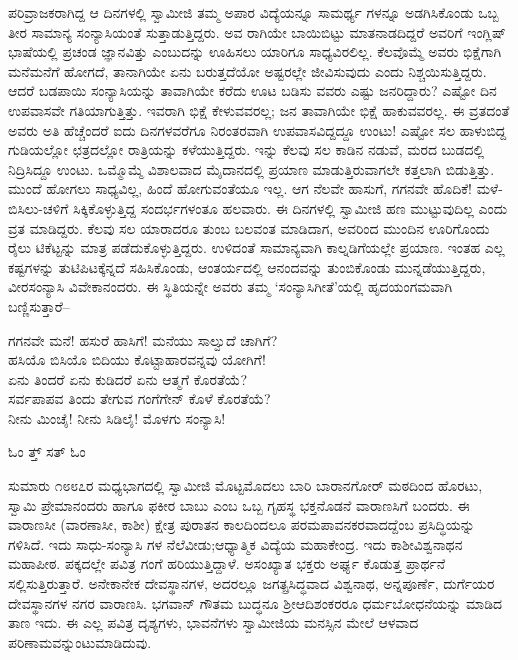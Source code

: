 ಪರಿವ್ರಾಜಕರಾಗಿದ್ದ ಆ ದಿನಗಳಲ್ಲಿ ಸ್ವಾಮೀಜಿ ತಮ್ಮ ಅಪಾರ ವಿದ್ಯೆಯನ್ನೂ ಸಾಮರ್ಥ್ಯ ಗಳನ್ನೂ ಅಡಗಿಸಿಕೊಂಡು ಒಬ್ಬ ತೀರ ಸಾಮಾನ್ಯ ಸಂನ್ಯಾಸಿಯಂತೆ ಸುತ್ತಾಡುತ್ತಿದ್ದರು. ಅವ ರಾಗಿಯೇ ಬಾಯಿಬಿಟ್ಟು ಮಾತನಾಡದಿದ್ದರೆ ಅವರಿಗೆ ಇಂಗ್ಲಿಷ್ ಭಾಷೆಯಲ್ಲಿ ಪ್ರಚಂಡ ಜ್ಞಾನವಿತ್ತು ಎಂಬುದನ್ನು ಊಹಿಸಲು ಯಾರಿಗೂ ಸಾಧ್ಯವಿರಲಿಲ್ಲ. ಕೆಲವೊಮ್ಮೆ ಅವರು ಭಿಕ್ಷೆಗಾಗಿ ಮನೆಮನೆಗೆ ಹೋಗದೆ, ತಾನಾಗಿಯೇ ಏನು ಬರುತ್ತದೆಯೋ ಅಷ್ಟರಲ್ಲೇ ಜೀವಿಸುವುದು ಎಂದು ನಿಶ್ಚಯಿಸುತ್ತಿದ್ದರು. ಆದರೆ ಬಡಪಾಯಿ ಸಂನ್ಯಾಸಿಯನ್ನು ತಾವಾಗಿಯೇ ಕರೆದು ಊಟ ಬಡಿಸು ವವರು ಎಷ್ಟು ಜನರಿದ್ದಾರು? ಎಷ್ಟೋ ದಿನ ಉಪವಾಸವೇ ಗತಿಯಾಗುತ್ತಿತ್ತು. ಇವರಾಗಿ ಭಿಕ್ಷೆ ಕೇಳುವವರಲ್ಲ; ಜನ ತಾವಾಗಿಯೇ ಭಿಕ್ಷೆ ಹಾಕುವವರಲ್ಲ. ಈ ವ್ರತದಂತೆ ಅವರು ಅತಿ ಹೆಚ್ಚೆಂದರೆ ಐದು ದಿನಗಳವರೆಗೂ ನಿರಂತರವಾಗಿ ಉಪವಾಸವಿದ್ದದ್ದೂ ಉಂಟು! ಎಷ್ಟೋ ಸಲ ಹಾಳುಬಿದ್ದ ಗುಡಿಯಲ್ಲೋ ಛತ್ರದಲ್ಲೋ ರಾತ್ರಿಯನ್ನು ಕಳೆಯುತ್ತಿದ್ದರು. ಇನ್ನು ಕೆಲವು ಸಲ ಕಾಡಿನ ನಡುವೆ, ಮರದ ಬುಡದಲ್ಲಿ ನಿದ್ರಿಸಿದ್ದೂ ಉಂಟು. ಒಮ್ಮೊಮ್ಮೆ ವಿಶಾಲವಾದ ಮೈದಾನದಲ್ಲಿ ಪ್ರಯಾಣ ಮಾಡುತ್ತಿರುವಾಗಲೇ ಕತ್ತಲಾಗಿ ಬಿಡುತ್ತಿತ್ತು. ಮುಂದೆ ಹೋಗಲು ಸಾಧ್ಯವಿಲ್ಲ, ಹಿಂದೆ ಹೋಗುವಂತೆಯೂ ಇಲ್ಲ. ಆಗ ನೆಲವೇ ಹಾಸುಗೆ, ಗಗನವೇ ಹೊದಿಕೆ! ಮಳೆ-ಬಿಸಿಲು-ಚಳಿಗೆ ಸಿಕ್ಕಿಕೊಳ್ಳುತ್ತಿದ್ದ ಸಂದರ್ಭಗಳಂತೂ ಹಲವಾರು. ಈ ದಿನಗಳಲ್ಲಿ ಸ್ವಾಮೀಜಿ ಹಣ ಮುಟ್ಟುವುದಿಲ್ಲ ಎಂದು ವ್ರತ ಮಾಡಿದ್ದರು. ಕೆಲವು ಸಲ ಯಾರಾದರೂ ತುಂಬ ಬಲವಂತ ಮಾಡಿದಾಗ, ಅವರಿಂದ ಮುಂದಿನ ಊರಿಗೊಂದು ರೈಲು ಟಿಕೆಟ್ಟನ್ನು ಮಾತ್ರ ಪಡೆದುಕೊಳ್ಳುತ್ತಿದ್ದರು. ಉಳಿದಂತೆ ಸಾಮಾನ್ಯವಾಗಿ ಕಾಲ್ನಡಿಗೆಯಲ್ಲೇ ಪ್ರಯಾಣ. ಇಂತಹ ಎಲ್ಲ ಕಷ್ಟಗಳನ್ನು ತುಟಿಪಿಟಕ್ಕೆನ್ನದೆ ಸಹಿಸಿಕೊಂಡು, ಆಂತರ್ಯದಲ್ಲಿ ಆನಂದವನ್ನು ತುಂಬಿಕೊಂಡು ಮುನ್ನಡೆಯುತ್ತಿದ್ದರು, ವೀರಸಂನ್ಯಾಸಿ ವಿವೇಕಾನಂದರು. ಈ ಸ್ಥಿತಿಯನ್ನೇ ಅವರು ತಮ್ಮ ‘ಸಂನ್ಯಾಸಿಗೀತೆ’ಯಲ್ಲಿ  ಹೃದಯಂಗಮವಾಗಿ ಬಣ್ಣಿಸುತ್ತಾರೆ–

\begin{myquote}
ಗಗನವೇ ಮನೆ! ಹಸುರೆ ಹಾಸಿಗೆ! ಮನೆಯು ಸಾಲ್ವುದೆ ಚಾಗಿಗೆ?\\ಹಸಿಯೊ ಬಿಸಿಯೊ ಬಿದಿಯು ಕೊಟ್ಟಾಹಾರವನ್ನವು ಯೋಗಿಗೆ!\\ಏನು ತಿಂದರೆ ಏನು ಕುಡಿದರೆ ಏನು ಆತ್ಮಗೆ ಕೊರತೆಯೆ?\\ಸರ್ವಪಾಪವ ತಿಂದು ತೇಗುವ ಗಂಗೆಗೇನ್ ಕೊಳೆ ಕೊರತೆಯೆ?\\ನೀನು ಮಿಂಚೈ! ನೀನು ಸಿಡಿಲೈ! ಮೊಳಗು ಸಂನ್ಯಾಸಿ!
\end{myquote}

\begin{flushright}
ಓಂ ತ್ತ್ ಸತ್ ಓಂ
\end{flushright}

\noindent

ಸುಮಾರು ೧೮೮೭ರ ಮಧ್ಯಭಾಗದಲ್ಲಿ ಸ್ವಾಮೀಜಿ ಮೊಟ್ಟಮೊದಲು ಬಾರಿ ಬಾರಾನಗೋರ್ ಮಠದಿಂದ ಹೊರಟು, ಸ್ವಾಮಿ ಪ್ರೇಮಾನಂದರು ಹಾಗೂ ಫಕೀರ ಬಾಬು ಎಂಬ ಒಬ್ಬ ಗೃಹಸ್ಥ ಭಕ್ತನೊಡನೆ ವಾರಾಣಸಿಗೆ ಬಂದರು. ಈ ವಾರಾಣಸೀ (ವಾರಣಾಸೀ, ಕಾಶೀ) ಕ್ಷೇತ್ರ ಪುರಾತನ ಕಾಲದಿಂದಲೂ ಪರಮಪಾವನಕರವಾದದ್ದೆಂಬ ಪ್ರಸಿದ್ಧಿಯನ್ನು ಗಳಿಸಿದೆ. ಇದು ಸಾಧು-ಸಂನ್ಯಾಸಿ ಗಳ ನೆಲೆವೀಡು;ಆಧ್ಯಾತ್ಮಿಕ ವಿದ್ಯೆಯ ಮಹಾಕೇಂದ್ರ. ಇದು ಕಾಶೀವಿಶ್ವನಾಥನ ಮಹಾಪೀಠ. ಪಕ್ಕದಲ್ಲೇ ಪವಿತ್ರ ಗಂಗೆ ಹರಿಯುತ್ತಿದ್ದಾಳೆ. ಅಸಂಖ್ಯಾತ ಭಕ್ತರು ಅರ್ಘ್ಯ ಕೊಡುತ್ತ ಪ್ರಾರ್ಥನೆ ಸಲ್ಲಿಸುತ್ತಿರುತ್ತಾರೆ. ಅನೇಕಾನೇಕ ದೇವಸ್ಥಾನಗಳ, ಅದರಲ್ಲೂ ಜಗತ್ಪ್ರಸಿದ್ಧವಾದ ವಿಶ್ವನಾಥ, ಅನ್ನಪೂರ್ಣೆ, ದುರ್ಗೆಯರ ದೇವಸ್ಥಾನಗಳ ನಗರ ವಾರಾಣಸಿ. ಭಗವಾನ್ ಗೌತಮ ಬುದ್ಧನೂ ಶ್ರೀಆದಿಶಂಕರರೂ ಧರ್ಮಬೋಧನೆಯನ್ನು ಮಾಡಿದ ತಾಣ ಇದು. ಈ ಎಲ್ಲ ಪವಿತ್ರ ದೃಶ್ಯಗಳು, ಭಾವನೆಗಳು ಸ್ವಾಮೀಜಿಯ ಮನಸ್ಸಿನ ಮೇಲೆ ಆಳವಾದ ಪರಿಣಾಮವನ್ನುಂಟುಮಾಡಿದುವು.

